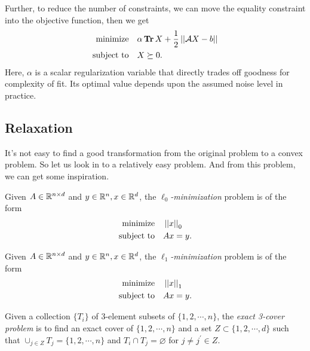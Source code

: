 \documentclass[11pt]{article}
\begin{document}
Further, to reduce the number of constraints, we can move the equality constraint into the objective function, then we get
\[\begin{aligned}
    \textnormal{minimize}\quad & \alpha\operatorname{\mathbf{Tr}} X+\frac12\left|\left|\mathcal AX-b\right|\right|\\
    \textnormal{subject to}\quad & X\succeq 0.
\end{aligned}\]
Here, \(\alpha\) is a scalar regularization variable that directly trades off goodness for complexity of fit. Its optimal value depends upon the assumed noise level in practice.

\subsection{Relaxation}

It's not easy to find a good transformation from the original problem to a convex problem. So let us look in to a relatively easy problem. And from this problem, we can get some inspiration\cite{horstmeyer2015solving}.

\begin{definition}
    Given $A \in \mathbb R^{n \times d}$ and $y \in \mathbb R^n, x \in \mathbb R^d$, the \emph{\(\ell_0\)-minimization} problem is of the form
    \[\begin{aligned}
        \textnormal{minimize}\quad & \left|\left|x\right|\right|_0\\
        \textnormal{subject to}\quad & Ax=y.
    \end{aligned}\]
\end{definition}

\begin{definition}
    Given $A \in \mathbb R^{n \times d}$ and $y \in \mathbb R^n, x \in \mathbb R^d$, the \emph{\(\ell_1\)-minimization} problem is of the form
    \[\begin{aligned}
        \textnormal{minimize}\quad & \left|\left|x\right|\right|_1\\
        \textnormal{subject to}\quad & Ax=y.
    \end{aligned}\]
\end{definition}

\begin{problem}\label{prb:exact-three-cover}
    Given a collection \(\{T_i\}\) of 3-element subsets of \(\{1,2,\cdots,n\}\), the \emph{exact 3-cover problem} is to find an exact cover of \(\{1,2,\cdots,n\}\) and a set \(Z \subset \{1,2,\cdots,d\}\) such that \(\cup_{j \in Z}T_j = \{1,2,\cdots,n\}\) and \(T_i \cap T_j = \varnothing\) for \(j \neq j^\prime\in Z\).
\end{problem}
\end{document}
